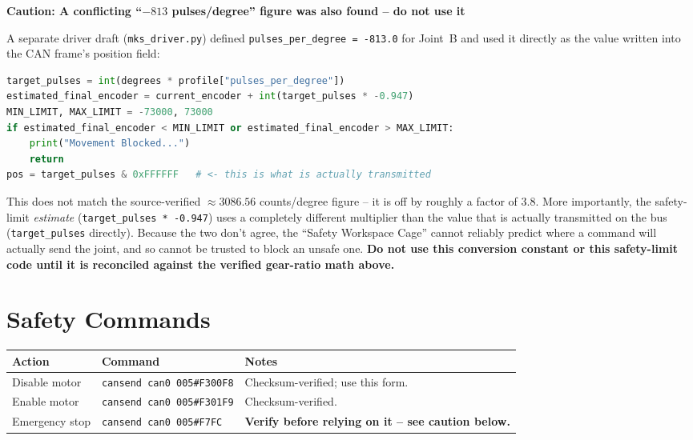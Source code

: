 \documentclass[11pt,letterpaper]{article}
\newenvironment{caution}[1]{%
    \par\addvspace{8pt}%
    \noindent{\color{cautionred}\rule{\linewidth}{0.8pt}}\par\vspace{2pt}
    \noindent\textbf{\color{cautionred}Caution: #1}\par\vspace{2pt}
}{%
    \par\vspace{2pt}\noindent{\color{cautionred}\rule{\linewidth}{0.4pt}}%
    \par\addvspace{8pt}%
}
\begin{document}
\begin{caution}{A conflicting ``$-813$ pulses/degree'' figure was also found -- do not use it}
A separate driver draft (\texttt{mks\_driver.py}) defined \texttt{pulses\_per\_degree~=~-813.0} for Joint~B and used it directly as the value written into the CAN frame's position field:
\begin{lstlisting}[language=python]
target_pulses = int(degrees * profile["pulses_per_degree"])
estimated_final_encoder = current_encoder + int(target_pulses * -0.947)
MIN_LIMIT, MAX_LIMIT = -73000, 73000
if estimated_final_encoder < MIN_LIMIT or estimated_final_encoder > MAX_LIMIT:
    print("Movement Blocked...")
    return
pos = target_pulses & 0xFFFFFF   # <- this is what is actually transmitted
\end{lstlisting}
This does not match the source-verified $\approx 3086.56$ counts/degree figure -- it is off by roughly a factor of 3.8. More importantly, the safety-limit \emph{estimate} (\texttt{target\_pulses~*~-0.947}) uses a completely different multiplier than the value that is actually transmitted on the bus (\texttt{target\_pulses} directly). Because the two don't agree, the ``Safety Workspace Cage'' cannot reliably predict where a command will actually send the joint, and so cannot be trusted to block an unsafe one. \textbf{Do not use this conversion constant or this safety-limit code until it is reconciled against the verified gear-ratio math above.}
\end{caution}

\newpage
\section{Safety Commands}
\label{sec:safety}

\begin{table}[h]
\centering
\begin{tabular}{lll}
\toprule
\textbf{Action} & \textbf{Command} & \textbf{Notes} \\ \midrule
Disable motor & \texttt{cansend can0 005\#F300F8} & Checksum-verified; use this form. \\
Enable motor & \texttt{cansend can0 005\#F301F9} & Checksum-verified. \\
Emergency stop & \texttt{cansend can0 005\#F7FC} & \textbf{Verify before relying on it -- see caution below.} \\ \bottomrule
\end{tabular}
\end{table}
\end{document}
